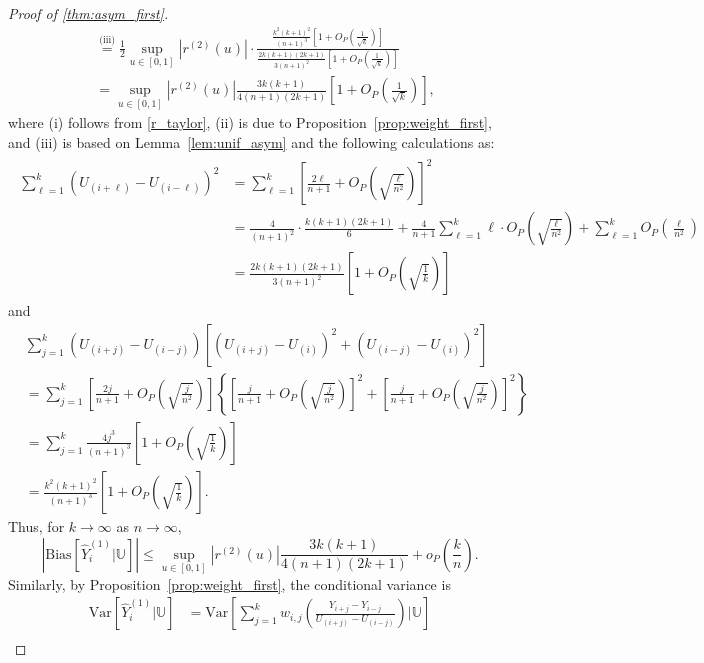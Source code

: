 \documentclass{uwstat572}
\theoremstyle{definition}
\renewcommand{\hat}{\widehat}
\theoremstyle{theorem}
\begin{document}
\begin{proof}[Proof of \autoref{thm:asym_first}]
\begin{align*}
&\stackrel{\text{(iii)}}{=} \frac{1}{2} \sup_{u\in [0,1]} \left|r^{(2)}(u) \right| \cdot \frac{\frac{k^2(k+1)^2}{(n+1)^3}\left[1+ O_P\left(\frac{1}{\sqrt{k}}\right)\right]}{\frac{2k(k+1)(2k+1)}{3(n+1)^2}\left[1+ O_P\left(\frac{1}{\sqrt{k}}\right)\right]}\\
&= \sup_{u\in [0,1]} \left|r^{(2)}(u) \right| \frac{3k(k+1)}{4(n+1)(2k+1)} \left[1+ O_P\left(\frac{1}{\sqrt{k}}\right)\right],
\end{align*}
where (i) follows from \eqref{r_taylor}, (ii) is due to Proposition~\ref{prop:weight_first}, and (iii) is based on Lemma~\ref{lem:unif_asym} and the following calculations as:
\begin{align}
\label{U_sq_bnd}
\begin{split}
\sum_{\ell=1}^k \left(U_{(i+\ell)} - U_{(i-\ell)}\right)^2 &= \sum_{\ell=1}^k \left[\frac{2\ell}{n+1} +O_P\left(\sqrt{\frac{\ell}{n^2}}\right) \right]^2\\
&= \frac{4}{(n+1)^2} \cdot \frac{k(k+1)(2k+1)}{6} + \frac{4}{n+1} \sum_{\ell=1}^k \ell \cdot O_P\left(\sqrt{\frac{\ell}{n^2}}\right) + \sum_{\ell=1}^k O_P\left(\frac{\ell}{n^2}\right)\\
&=\frac{2k(k+1)(2k+1)}{3(n+1)^2}\left[1+ O_P\left(\sqrt{\frac{1}{k}}\right)\right]
\end{split}
\end{align}
and
\begin{align*}
&\sum_{j=1}^k (U_{(i+j)} - U_{(i-j)}) \left[(U_{(i+j)} - U_{(i)})^2 + (U_{(i-j)} - U_{(i)})^2 \right] \\
&= \sum_{j=1}^k \left[\frac{2j}{n+1} +O_P\left(\sqrt{\frac{j}{n^2}}\right) \right] \left\{\left[\frac{j}{n+1} +O_P\left(\sqrt{\frac{j}{n^2}}\right)\right]^2 + \left[\frac{j}{n+1} +O_P\left(\sqrt{\frac{j}{n^2}}\right)\right]^2 \right\} \\
&= \sum_{j=1}^k \frac{4j^3}{(n+1)^3} \left[1+O_P\left(\sqrt{\frac{1}{k}}\right)\right]\\
&= \frac{k^2(k+1)^2}{(n+1)^3} \left[1+O_P\left(\sqrt{\frac{1}{k}}\right)\right].
\end{align*}
Thus, for $k\to \infty$ as $n\to \infty$, 
$$\left|\mathrm{Bias}\left[\hat{Y}_i^{(1)} \big| \mathbb{U}\right] \right| \leq \sup_{u\in [0,1]} \left|r^{(2)}(u)\right| \frac{3k(k+1)}{4(n+1)(2k+1)} + o_P\left(\frac{k}{n}\right).$$
Similarly, by Proposition~\ref{prop:weight_first}, the conditional variance is
\begin{align*}
\mathrm{Var}\left[\hat{Y}_i^{(1)} \big| \mathbb{U}\right] &= \mathrm{Var}\left[\sum_{j=1}^k w_{i,j}\left(\frac{Y_{i+j} - Y_{i-j}}{U_{(i+j)} - U_{(i-j)}}\right) \Big| \mathbb{U} \right] \\

\end{align*}
\end{proof}
\end{document}
